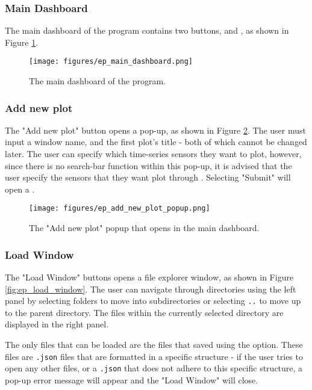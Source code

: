 \documentclass{article}
\begin{document}
\subsubsection{Main Dashboard}
The main dashboard of the program contains two buttons, \textbf{} and \textbf{}, as shown in Figure \ref{fig:ep_main_dashboard}.

\begin{figure} [h]
    \centering
    \texttt{[image: figures/ep\_main\_dashboard.png]}
    \caption{\label{fig:ep_main_dashboard} The main dashboard of the program.}
\end{figure}

\newpage

\subsubsection{Add new plot}
\label{sec:Add_new_plot}
The "Add new plot" button opens a pop-up, as shown in Figure \ref{fig:ep_new_plot_popup}. The user must input a window name, and the first plot's title - both of which cannot be changed later. The user can specify which time-series sensors they want to plot, however, since there is no search-bar function within this pop-up, it is advised that the user specify the sensors that they want plot through \textbf{}.
Selecting "Submit" will open a \textbf{}.

\begin{figure} [h]
    \centering
    \texttt{[image: figures/ep\_add\_new\_plot\_popup.png]}
    \caption{\label{fig:ep_new_plot_popup} The "Add new plot" popup that opens in the main dashboard.}
\end{figure}

\newpage

\subsubsection{Load Window}
\label{sec:Load_window}
The "Load Window" buttons opens a file explorer window, as shown in Figure \ref{fig:ep_load_window}. The user can navigate through directories using the left panel by selecting folders to move into subdirectories or selecting \texttt{..} to move up to the parent directory. The files within the currently selected directory are displayed in the right panel.

\vspace{5pt}
\noindent
The only files that can be loaded are the files that saved using the \textbf{} option. These files are \texttt{.json} files that are formatted in a specific structure - if the user tries to open any other files, or a \texttt{.json} that does not adhere to this specific structure, a pop-up error message will appear and the "Load Window" will close.
\end{document}
